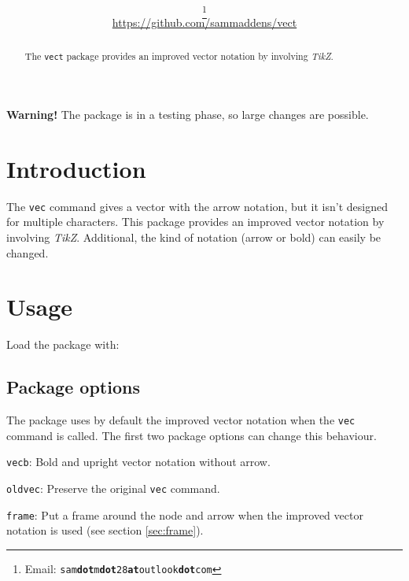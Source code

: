 \documentclass[12pt]{article}
\title{\TITLE\\\smallskip\large\SUBTITLE}
\author{\AUTHOR\footnote{Email: \tt sam{\color{blue}\textbf{dot}}m{\color{blue}\textbf{dot}}28{\color{blue}\textbf{at}}outlook{\color{blue}\textbf{dot}}com}
\\{\normalsize \url{https://github.com/sammaddens/vect}}}
\date{\normalsize\VERSION}
\newcommand{\optPackage}[1]{{\color{blue}\tt{#1}}}
\begin{document}
\maketitle

\begin{abstract}
\noindent The \verb|vect| package provides an improved vector notation by involving \textit{TikZ}.
\end{abstract}

{\color{red}\textbf{Warning!}} The package is in a testing phase, so large changes are possible.

\tableofcontents

\newpage

\section{Introduction}

The \verb|vec| command gives a vector with the arrow notation, but it isn't designed for multiple characters. This package provides an improved vector notation by involving \textit{TikZ}. Additional, the kind of notation (arrow or bold) can easily be changed.

\section{Usage}

Load the package with:

\cmdPackage{\usepackage[<options>]{vect}}

\subsection{Package options}

The package uses by default the improved vector notation when the \verb|vec| command is called. The first two package options can change this behaviour.\bigskip

\begin{bulItem}
\item \optPackage{vecb}: Bold and upright vector notation without arrow.\bigskip

\item \optPackage{oldvec}: Preserve the original \verb|vec| command.\bigskip

\item \optPackage{frame}: Put a frame around the node and arrow when the improved vector notation is used (see section \ref{sec:frame}).
\end{bulItem}\bigskip
\end{document}

